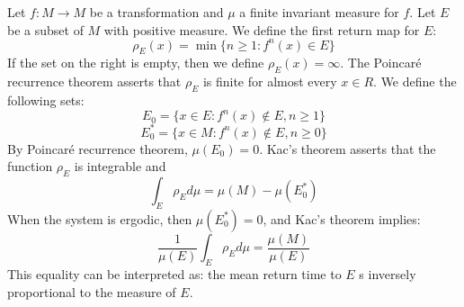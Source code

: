 \documentclass[12pt]{article}
\begin{document}
Let $f:M\rightarrow M$ be a transformation and $\mu$ a finite invariant measure for $f$. Let $E$ be a subset of $M$ with positive measure. We define the first return map for $E$:
$$\rho_E(x)=\min \{ n \geq 1: f^n(x)\in E \}$$
If the set on the right is empty, then we define $\rho_E(x)=\infty$. The Poincaré recurrence theorem asserts that $\rho_E$ is finite for almost every $x \in R$.
We define the following sets:
$$E_0 = \{ x \in E: f^n(x) \notin E, n\geq 1 \}$$
$$E_0^*= \{ x \in M: f^n(x) \notin E, n \geq 0 \}$$
By Poincaré recurrence theorem, $\mu(E_0)=0$.
Kac's theorem asserts that the function $\rho_E$ is integrable and
$$\int_E \rho_E d\mu= \mu(M)-\mu(E_0^*)$$
When the system is ergodic, then $\mu(E_0^*)=0$, and Kac's theorem implies:
$$\frac{1}{\mu(E)}\int_E \rho_E d\mu = \frac{\mu(M)}{\mu(E)}$$
This equality can be interpreted as: the mean return time to $E$ s inversely proportional to the measure of $E$.
\end{document}
